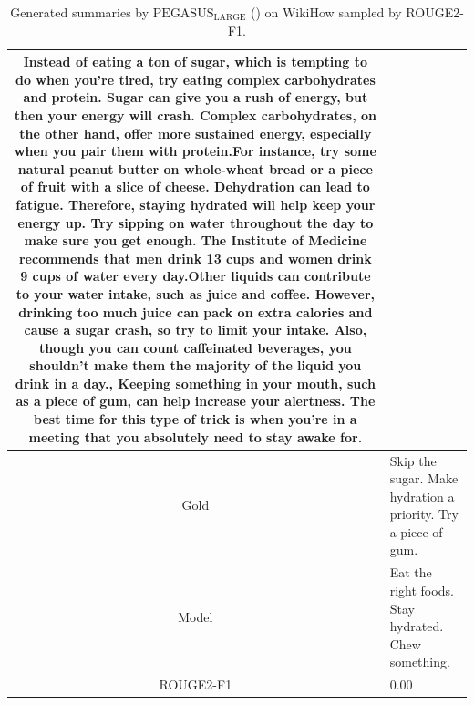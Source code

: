 \begin{table}[bth!]
\begin{tabular}{c|p{}}
Instead of eating a ton of sugar, which is tempting to do when you're tired, try eating complex carbohydrates and protein. Sugar can give you a rush of energy, but then your energy will crash. Complex carbohydrates, on the other hand, offer more sustained energy, especially when you pair them with protein.For instance, try some natural peanut butter on whole-wheat bread or a piece of fruit with a slice of cheese. Dehydration can lead to fatigue. Therefore, staying hydrated will help keep your energy up. Try sipping on water throughout the day to make sure you get enough. The Institute of Medicine recommends that men drink 13 cups and women drink 9 cups of water every day.Other liquids can contribute to your water intake, such as juice and coffee. However, drinking too much juice can pack on extra calories and cause a sugar crash, so try to limit your intake. Also, though you can count caffeinated beverages, you shouldn't make them the majority of the liquid you drink in a day., Keeping something in your mouth, such as a piece of gum, can help increase your alertness. The best time for this type of trick is when you're in a meeting that you absolutely need to stay awake for.
\\ \hline
Gold & 
Skip the sugar. Make hydration a priority. Try a piece of gum.
\\ \hline
Model & 
Eat the right foods. Stay hydrated. Chew something.
\\ \hline
ROUGE2-F1 & 
0.00
\\ \hline
\end{tabular}
\caption{Generated summaries by $\text{PEGASUS}_{\text{LARGE}}$ (\gnews) on WikiHow sampled by ROUGE2-F1.}
\end{table}
